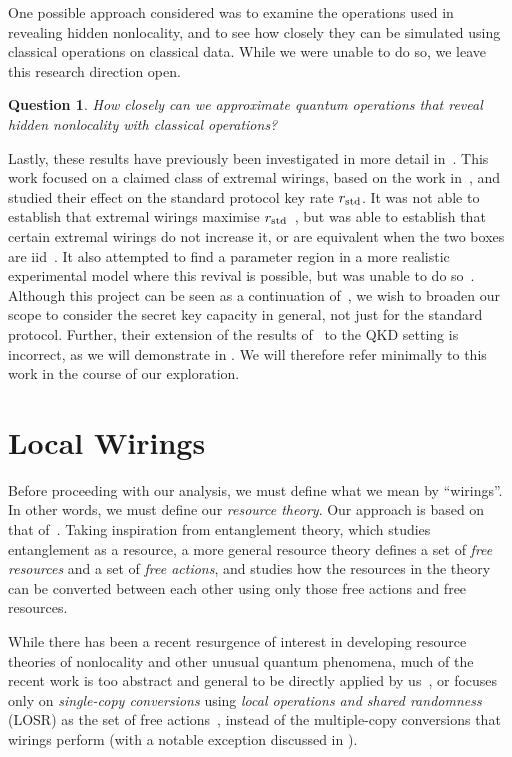 \documentclass[10pt, a4paper]{article}
\numberwithin{equation}{section} %
\theoremstyle{definition}
\theoremstyle{plain}
\newtheorem{question}{Question}
\newcommand{\?}{\mathrel{?}} %
\newcommand{\std}{\rm std}
\begin{document}
              One possible approach considered was to examine the operations used in revealing hidden nonlocality, and to see how closely they can be simulated using classical operations on classical data. While we were unable to do so, we leave this research direction open.
              \begin{question}
                How closely can we approximate quantum operations that reveal hidden nonlocality with classical operations?
              \end{question}

              Lastly, these results have previously been investigated in more detail in~\cite{JanLiThesis}. This work focused on a claimed class of extremal wirings, based on the work in~\cite{ShortEntangleSwap}, and studied their effect on the standard protocol key rate \(r_{\std}\). It was not able to establish that extremal wirings maximise \(r_{\std}\)~\cite[Sec. 7.2]{JanLiThesis}, but was able to establish that certain extremal wirings do not increase it, or are equivalent when the two boxes are iid~\cite[Sec. 7.3]{JanLiThesis}. It also attempted to find a parameter region in a more realistic experimental model where this revival is possible, but was unable to do so~\cite[Sec. 9]{JanLiThesis}. Although this project can be seen as a continuation of~\cite{JanLiThesis}, we wish to broaden our scope to consider the secret key capacity in general, not just for the standard protocol. Further, their extension of the results of~\cite{ShortEntangleSwap} to the QKD setting is incorrect, as we will demonstrate in . We will therefore refer minimally to this work in the course of our exploration.

              \section{Local Wirings}\label{sec:locwir}

              Before proceeding with our analysis, we must define what we mean by ``wirings''. In other words, we must define our \emph{resource theory}. Our approach is based on that of~\cite{NonclassicalCausation}. Taking inspiration from entanglement theory, which studies entanglement as a resource, a more general resource theory defines a set of \emph{free resources} and a set of \emph{free actions}, and studies how the resources in the theory can be converted between each other using only those free actions and free resources.

              While there has been a recent resurgence of interest in developing resource theories of nonlocality and other unusual quantum phenomena, much of the recent work is too abstract and general to be directly applied by us~\cite{Monotones, TypeIndepLOSR}, or focuses only on \emph{single-copy conversions} using \emph{local operations and shared randomness} (LOSR) as the set of free actions~\cite{NonclassicalCausation, TraceDistNL, NLMeas}, instead of the multiple-copy conversions that wirings perform (with a notable exception discussed in ).
\end{document}
